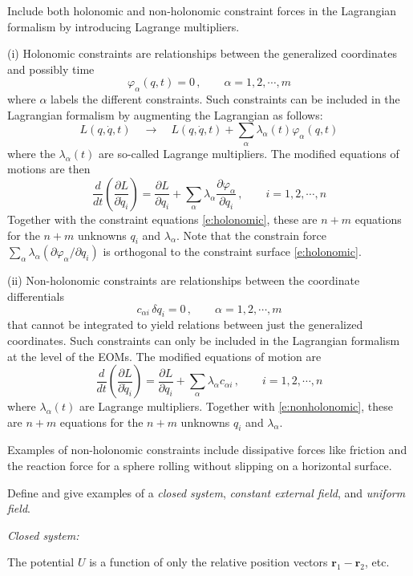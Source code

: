 \documentclass[10pt]{article}
\numberwithin{equation}{section}
\def\be{\begin{equation}}
\def\ee{\end{equation}}
\def\i{\item{}}
\renewcommand{\vec}[1]{\mathbf{#1}}
\begin{document}
\i Include both holonomic and non-holonomic constraint forces 
in the Lagrangian formalism by introducing Lagrange multipliers.

(i) Holonomic constraints are relationships between the generalized
coordinates and possibly time
%
\be
\varphi_\alpha(q,t)=0\,,
\qquad \alpha=1,2,\cdots,m
\label{e:holonomic}
\ee
%
where $\alpha$ labels the different constraints.
Such constraints can be included in the Lagrangian formalism
by augmenting the Lagrangian as follows:
%
\be
L(q,\dot q, t) 
\quad \rightarrow\quad
L(q,\dot q, t) + \sum_\alpha \lambda_\alpha(t) \varphi_\alpha(q,t)
\ee
%
where the $\lambda_\alpha(t)$ are so-called Lagrange multipliers.  The
modified equations of motions are then
%
\be
\frac{d}{dt}\left(\frac{\partial L}{\partial \dot q_i}\right)
= \frac{\partial L}{\partial q_i} + \sum_\alpha
\lambda_\alpha\frac{\partial\varphi_\alpha}{\partial q_i}\,,
\qquad i = 1,2,\cdots, n
\ee
%
Together with the constraint equations \eqref{e:holonomic}, these are $n+m$ 
equations for the $n+m$ unknowns $q_i$ and $\lambda_\alpha$.
Note that the constrain force
$\sum_\alpha \lambda_\alpha (\partial \varphi_\alpha/\partial q_i)$ is
orthogonal to the constraint surface \eqref{e:holonomic}.

(ii) Non-holonomic constraints are relationships between the coordinate
differentials 
%
\be
c_{\alpha i}\,\delta q_i = 0\,,
\qquad \alpha = 1,2,\cdots, m
\label{e:nonholonomic}
\ee
%
that cannot be integrated to yield relations between just the
generalized coordinates.
Such constraints can only be included in the Lagrangian formalism at
the level of the EOMs.
The modified equations of motion are
%
\be
\frac{d}{dt}\left(\frac{\partial L}{\partial \dot q_i}\right)
= \frac{\partial L}{\partial q_i} +
\sum_\alpha \lambda_\alpha c_{\alpha i}\,,
\qquad i=1,2,\cdots, n
\ee
%
where $\lambda_\alpha(t)$ are Lagrange multipliers.
Together with \eqref{e:nonholonomic}, these are $n+m$ equations 
for the $n+m$ unknowns $q_i$ and $\lambda_\alpha$.

Examples of non-holonomic constraints include dissipative 
forces like friction and the reaction force for a 
sphere rolling without slipping on a horizontal surface.

\i Define and give examples of a {\em closed system}, 
{\em constant external field}, and {\em uniform field}.

{\em Closed system:}

The potential $U$ is a function of only the relative position vectors
$\vec r_1-\vec r_2$, etc. 
\end{document}
